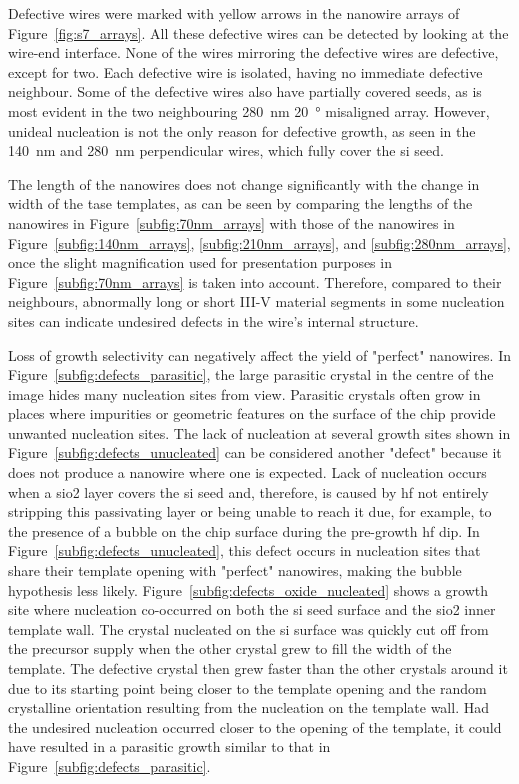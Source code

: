 Defective wires were marked with yellow arrows in the nanowire arrays of Figure~\ref{fig:s7_arrays}. All these defective wires can be detected by looking at the wire-end interface. None of the wires mirroring the defective wires are defective, except for two. Each defective wire is isolated, having no immediate defective neighbour. Some of the defective wires also have partially covered seeds, as is most evident in the two neighbouring \qty{280}{\nano\metre} \qty{20}{\degree} misaligned array. However, unideal nucleation is not the only reason for defective growth, as seen in the \qty{140}{\nano\metre} and \qty{280}{\nano\metre} perpendicular wires, which fully cover the \acl{si} seed.

The length of the nanowires does not change significantly with the change in width of the \acs{tase} templates, as can be seen by comparing the lengths of the nanowires in Figure~\ref{subfig:70nm_arrays} with those of the nanowires in Figure~\ref{subfig:140nm_arrays}, \ref{subfig:210nm_arrays}, and \ref{subfig:280nm_arrays}, once the slight magnification used for presentation purposes in Figure~\ref{subfig:70nm_arrays} is taken into account. Therefore, compared to their neighbours, abnormally long or short III-V material segments in some nucleation sites can indicate undesired defects in the wire's internal structure.

Loss of growth selectivity can negatively affect the yield of "perfect" nanowires. In Figure~\ref{subfig:defects_parasitic}, the large parasitic crystal in the centre of the image hides many nucleation sites from view. Parasitic crystals often grow in places where impurities or geometric features on the surface of the chip provide unwanted nucleation sites. The lack of nucleation at several growth sites shown in Figure~\ref{subfig:defects_unucleated} can be considered another "defect" because it does not produce a nanowire where one is expected. Lack of nucleation occurs when a \acs{sio2} layer covers the \acl{si} seed and, therefore, is caused by \acf{hf} not entirely stripping this passivating layer or being unable to reach it due, for example, to the presence of a bubble on the chip surface during the pre-growth \acs{hf} dip. In Figure~\ref{subfig:defects_unucleated}, this defect occurs in nucleation sites that share their template opening with "perfect" nanowires, making the bubble hypothesis less likely. Figure~\ref{subfig:defects_oxide_nucleated} shows a growth site where nucleation co-occurred on both the \acl{si} seed surface and the \acs{sio2} inner template wall. The crystal nucleated on the \acl{si} surface was quickly cut off from the precursor supply when the other crystal grew to fill the width of the template. The defective crystal then grew faster than the other crystals around it due to its starting point being closer to the template opening and the random crystalline orientation resulting from the nucleation on the template wall. Had the undesired nucleation occurred closer to the opening of the template, it could have resulted in a parasitic growth similar to that in Figure~\ref{subfig:defects_parasitic}.

